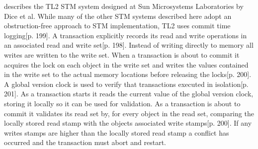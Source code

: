 \cite{dice2006transactional} describes the TL2 \ac{STM} system designed at Sun Microsystems Laboratories by Dice et al. While many of the other \ac{STM} systems described here adopt an obstruction-free approach to \ac{STM} implementation, TL2 uses commit time logging\cite{dice2006transactional}[p. 199]. A transaction explicitly records its read and write operations in an associated read and write set\cite{dice2006transactional}[p. 198]. Instead of writing directly to memory all writes are written to the write set. When a transaction is about to commit it acquires the lock on each object in the write set and writes the values contained in the write set to the actual memory locations before releasing the locks\cite{dice2006transactional}[p. 200].
A global version clock is used to verify that transactions executed in isolation\cite{dice2006transactional}[p. 201]. As a transaction starts it reads the current value of the global version clock, storing it locally so it can be used for validation. As a transaction is about to commit it validates its read set by, for every object in the read set, comparing the locally stored read stamp with the objects associated write stamps\cite{dice2006transactional}[p. 200]. If any writes stamps are higher than the locally stored read stamp a conflict has occurred and the transaction must abort and restart.

